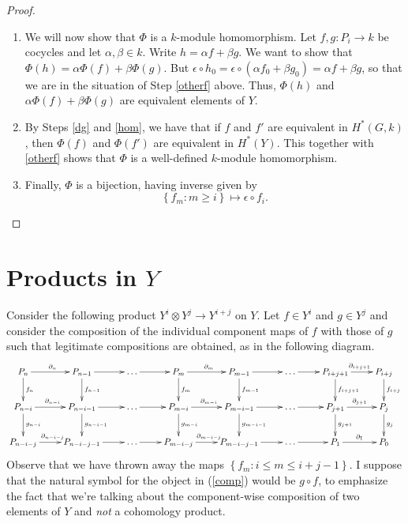 \documentclass[12pt]{article}
\begin{document}
\begin{proof}
\begin{enumerate}
\item\label{hom}
We will now show that $\Phi$ is a $k$-module homomorphism.
Let $f,g:P_i\to k$ be cocycles and let $\alpha,\beta\in k$.
Write $h=\alpha f+\beta g$. We want to show that 
$\Phi\left(h\right)=\alpha\Phi\left(f\right)+\beta\Phi\left(g\right)$.
But $\epsilon\circ h_0=\epsilon\circ\left(\alpha f_0+\beta g_0\right)
=\alpha f+\beta g$, so that we are in the situation
of Step \ref{otherf} above. Thus, 
$\Phi\left(h\right)$ and 
$\alpha\Phi\left(f\right)+\beta\Phi\left(g\right)$
are equivalent elements of $Y$.

\item By Steps \ref{dg} and \ref{hom}, we have that
if $f$ and $f'$ are equivalent in $H^\ast\left(G,k\right)$,
then $\Phi\left(f\right)$ and $\Phi\left(f'\right)$
are equivalent in $H^\ast\left(Y\right)$.
This together with \ref{otherf} shows that $\Phi$ is a 
well-defined $k$-module homomorphism.

\item Finally, $\Phi$ is a bijection, having inverse given by
\[\left\{f_m:m\ge i\right\}\mapsto\epsilon\circ f_i.\]
\end{enumerate}
\end{proof}

\section{Products in $Y$}
Consider the following product 
$Y^i\otimes Y^j\to Y^{i+j}$ on $Y$.
Let $f\in Y^i$ and $g\in Y^j$ and consider
the composition of the individual component
maps of $f$ with those of $g$ such that legitimate
compositions are obtained, as in the following diagram.
\begin{equation}\label{comp}\xymatrix{
P_n\ar[r]^{\partial_n}\ar[d]^{f_n}
&P_{n-1}\ar[d]^{f_{n-1}}\ar[r]
&\dots\ar[r]
&P_m\ar[r]^{\partial_m}\ar[d]^{f_m}
&P_{m-1}\ar[r]\ar[d]^{f_{m-1}}
&\dots\ar[r]
&P_{i+j+1}\ar[r]^{\partial_{i+j+1}}\ar[d]^{f_{i+j+1}}
&P_{i+j}\ar[d]^{f_{i+j}}
\\
P_{n-i}\ar[r]^{\partial_{n-i}}\ar[d]^{g_{n-i}}
&P_{n-i-1}\ar[r]\ar[d]^{g_{n-i-1}}
&\dots\ar[r]
&P_{m-i}\ar[r]^{\partial_{m-i}}\ar[d]^{g_{m-i}}
&P_{m-i-1}\ar[r]\ar[d]^{g_{m-i-1}}
&\dots\ar[r]
&P_{j+1}\ar[r]^{\partial_{j+1}}\ar[d]^{g_{j+1}}
&P_j\ar[d]^{g_j}
\\
P_{n-i-j}\ar[r]^{\partial_{n-i-j}}
&P_{n-i-j-1}\ar[r]
&\dots\ar[r]
&P_{m-i-j}\ar[r]^{\partial_{m-i-j}}
&P_{m-i-j-1}\ar[r]
&\dots\ar[r]
&P_1\ar[r]^{\partial_1}
&P_0
}\end{equation}
Observe that we have thrown away the maps 
$\left\{f_m:i\le m\le i+j-1\right\}$.
I suppose that the natural symbol 
for the object in (\ref{comp}) 
would be $g\circ f$, to emphasize
the fact that we're talking about
the component-wise composition of two elements of $Y$
and {\em not} a cohomology product.
\end{document}
